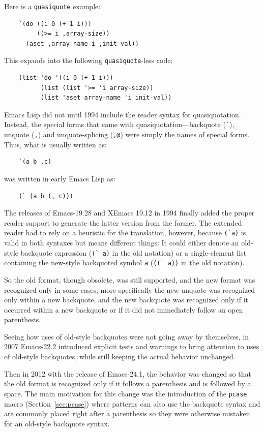 \documentclass[format=acmsmall, review]{acmart}
\newcommand \Elisp {Emacs Lisp}
\begin{document}
Here is a \texttt{quasiquote} example:
%
\begin{verbatim}
    `(do ((i 0 (+ 1 i)))
         ((>= i ,array-size))
      (aset ,array-name i ,init-val))
\end{verbatim}
%
This expands into the following \texttt{quasiquote}-less code:
%
\begin{verbatim}
    (list 'do '((i 0 (+ 1 i)))
          (list (list '>= 'i array-size))
          (list 'aset array-name 'i init-val))
\end{verbatim}
%
\Elisp{} did not until 1994 include the reader syntax for
quasiquotation.
Instead, the special forms that came with quasiquotation---backquote
(\verb|`|), unquote (\verb|,|) and unquote-splicing (\verb|,@|) were
simply the names of special forms.   Thus, what is usually written as:
\begin{verbatim}
    `(a b ,c)
\end{verbatim}
was written in early \Elisp{} as:
\begin{verbatim}
    (` (a b (, c)))
\end{verbatim}
The releases of Emacs-19.28 and XEmacs 19.12 in 1994 finally added the
proper reader support to generate the latter version from the former.
The extended reader had to rely on a heuristic for the translation, however,
because \verb|(`a)| is valid in both syntaxes but means different
things: It could either denote an old-style backquote expression
(\verb|(` a)| in the old notation) or a single-element list containing
the new-style backquoted symbol \texttt{a} (\verb|((` a))| in the old
notation).

So the old format, though obsolete, was still supported, and the
new format was recognized only in some cases; more specifically the new
unquote was recognized only within a new backquote, and the new
backquote was recognized only if it occurred within a new backquote or
if it did not immediately follow an open parenthesis.

Seeing how uses of old-style backquotes were not going away by themselves,
in 2007
Emacs-22.2 introduced explicit tests and warnings to bring attention to uses
of old-style backquotes, while still keeping the actual behavior unchanged.

Then in 2012 with the release of Emacs-24.1, the behavior was changed so
that the old format is recognized only if it follows a parenthesis and is
followed by a space.  The main motivation for this change was the
introduction of the \texttt{pcase} macro (Section~\ref{sec:pcase}) where
patterns can also use the
backquote syntax and are commonly placed right after a parenthesis so they
were otherwise mistaken for an old-style backquote syntax.
\end{document}
